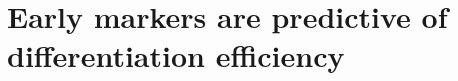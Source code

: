

\section{Early markers are predictive of differentiation efficiency}
\label{sec:endodiff_differentiation_efficiency}


